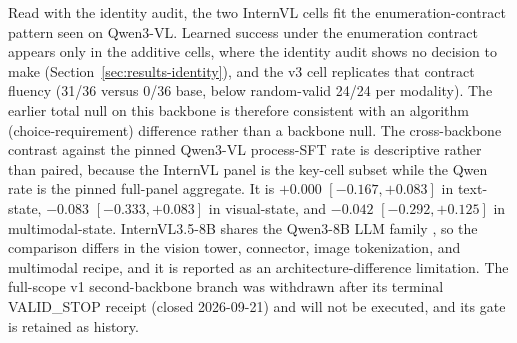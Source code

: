 Read with the identity audit, the two InternVL cells fit the enumeration-contract pattern seen on Qwen3-VL. Learned success under the enumeration contract appears only in the additive cells, where the identity audit shows no decision to make (Section~\ref{sec:results-identity}), and the v3 cell replicates that contract fluency (31/36 versus 0/36 base, below random-valid 24/24 per modality). The earlier total null on this backbone is therefore consistent with an algorithm (choice-requirement) difference rather than a backbone null. The cross-backbone contrast against the pinned Qwen3-VL process-SFT rate is descriptive rather than paired, because the InternVL panel is the key-cell subset while the Qwen rate is the pinned full-panel aggregate. It is $+0.000$ $[-0.167, +0.083]$ in text-state, $-0.083$ $[-0.333, +0.083]$ in visual-state, and $-0.042$ $[-0.292, +0.125]$ in multimodal-state. InternVL3.5-8B shares the Qwen3-8B LLM family \citep{yang2025qwen3}, so the comparison differs in the vision tower, connector, image tokenization, and multimodal recipe, and it is reported as an architecture-difference limitation. The full-scope v1 second-backbone branch was withdrawn after its terminal VALID\_STOP receipt (closed 2026-09-21) and will not be executed, and its gate is retained as history.

